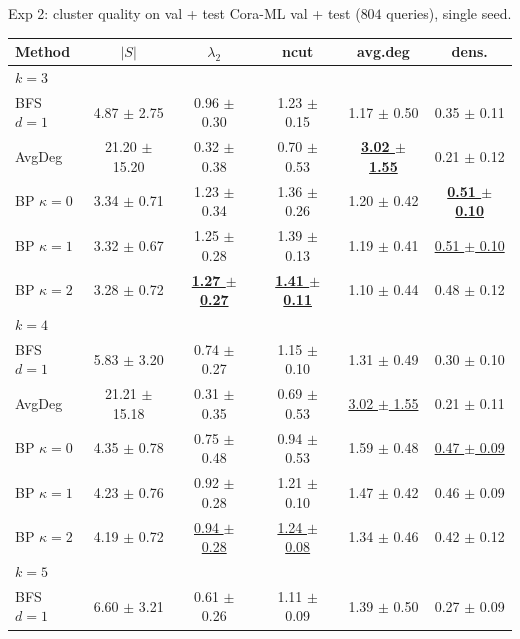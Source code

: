\documentclass{beamer}
\begin{document}
\begin{frame}{Exp 2: cluster quality on val + test}
  Cora-ML val + test ($804$ queries), single seed.

  \vfill

  \tiny
  \begin{center}
  \begin{tabular}{lccccc}
    \toprule
    Method & $|S|$ & $\lambda_2$ & ncut & avg.deg & dens. \\
    \midrule
    \multicolumn{6}{l}{\textit{$k = 3$}} \\
    BFS $d{=}1$              & 4.87 $\pm$ 2.75   & 0.96 $\pm$ 0.30 & 1.23 $\pm$ 0.15 & 1.17 $\pm$ 0.50 & 0.35 $\pm$ 0.11 \\
    AvgDeg                   & 21.20 $\pm$ 15.20 & 0.32 $\pm$ 0.38 & 0.70 $\pm$ 0.53 & \underline{\textbf{3.02 $\pm$ 1.55}} & 0.21 $\pm$ 0.12 \\
    BP $\kappa{=}0$          & 3.34 $\pm$ 0.71   & 1.23 $\pm$ 0.34 & 1.36 $\pm$ 0.26 & 1.20 $\pm$ 0.42 & \underline{\textbf{0.51 $\pm$ 0.10}} \\
    BP $\kappa{=}1$          & 3.32 $\pm$ 0.67   & 1.25 $\pm$ 0.28 & 1.39 $\pm$ 0.13 & 1.19 $\pm$ 0.41 & \underline{0.51 $\pm$ 0.10} \\
    BP $\kappa{=}2$          & 3.28 $\pm$ 0.72   & \underline{\textbf{1.27 $\pm$ 0.27}} & \underline{\textbf{1.41 $\pm$ 0.11}} & 1.10 $\pm$ 0.44 & 0.48 $\pm$ 0.12 \\
    \midrule
    \multicolumn{6}{l}{\textit{$k = 4$}} \\
    BFS $d{=}1$              & 5.83 $\pm$ 3.20   & 0.74 $\pm$ 0.27 & 1.15 $\pm$ 0.10 & 1.31 $\pm$ 0.49 & 0.30 $\pm$ 0.10 \\
    AvgDeg                   & 21.21 $\pm$ 15.18 & 0.31 $\pm$ 0.35 & 0.69 $\pm$ 0.53 & \underline{3.02 $\pm$ 1.55} & 0.21 $\pm$ 0.11 \\
    BP $\kappa{=}0$          & 4.35 $\pm$ 0.78   & 0.75 $\pm$ 0.48 & 0.94 $\pm$ 0.53 & 1.59 $\pm$ 0.48 & \underline{0.47 $\pm$ 0.09} \\
    BP $\kappa{=}1$          & 4.23 $\pm$ 0.76   & 0.92 $\pm$ 0.28 & 1.21 $\pm$ 0.10 & 1.47 $\pm$ 0.42 & 0.46 $\pm$ 0.09 \\
    BP $\kappa{=}2$          & 4.19 $\pm$ 0.72   & \underline{0.94 $\pm$ 0.28} & \underline{1.24 $\pm$ 0.08} & 1.34 $\pm$ 0.46 & 0.42 $\pm$ 0.12 \\
    \midrule
    \multicolumn{6}{l}{\textit{$k = 5$}} \\
    BFS $d{=}1$              & 6.60 $\pm$ 3.21   & 0.61 $\pm$ 0.26 & 1.11 $\pm$ 0.09 & 1.39 $\pm$ 0.50 & 0.27 $\pm$ 0.09 \\

\end{tabular}
\end{center}
\end{frame}
\end{document}
